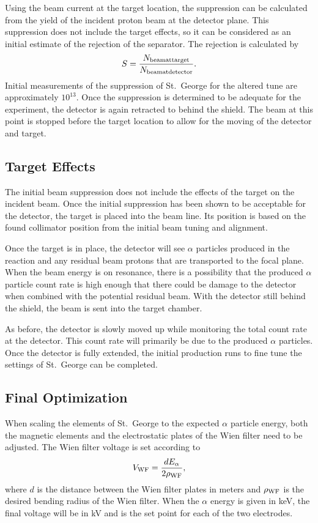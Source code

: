 Using the beam current at the target location, the suppression can be
calculated from the yield of the incident proton beam at the detector
plane. This suppression does not include the target effects, so it can be
considered as an initial estimate of the rejection of the separator. The
rejection is calculated by
\[
    S = \frac{N_{\rm beam at target}}{N_{\rm beam at detector}}.
\]
Initial measurements of the suppression of St.\ George for the altered
tune are approximately $10^{13}$. Once the suppression is determined to
be adequate for the experiment, the detector is again retracted to
behind the shield. The beam at this point is stopped before the target
location to allow for the moving of the detector and target.

\subsection{Target Effects}

The initial beam suppression does not include the effects of the target
on the incident beam. Once the initial suppression has been shown to be
acceptable for the detector, the target is placed into the beam line.
Its position is based on the found collimator position from the initial
beam tuning and alignment.

Once the target is in place, the detector will see $\alpha$ particles
produced in the reaction and any residual beam protons that are
transported to the focal plane. When the beam energy is on resonance,
there is a possibility that the produced $\alpha$ particle count rate is
high enough that there could be damage to the detector when combined
with the potential residual beam. With the detector still behind the
shield, the beam is sent into the target chamber.

As before, the detector is slowly moved up while monitoring the total
count rate at the detector. This count rate will primarily be due to the
produced $\alpha$ particles. Once the detector is fully extended, the
initial production runs to fine tune the settings of St.\ George can be
completed.

\subsection{Final Optimization}

When scaling the elements of St.\ George to the expected $\alpha$
particle energy, both the magnetic elements and the electrostatic plates
of the Wien filter need to be adjusted. The Wien filter voltage is set
according to
\[
    V_{\rm WF} = \frac{d E_{\alpha}}{2 \rho_{\rm WF}},
\]
where $d$ is the distance between the Wien filter plates in meters and
$\rho_{\rm WF}$ is the desired bending radius of the Wien filter. When
the $\alpha$ energy is given in keV, the final voltage will be in kV and
is the set point for each of the two electrodes.

